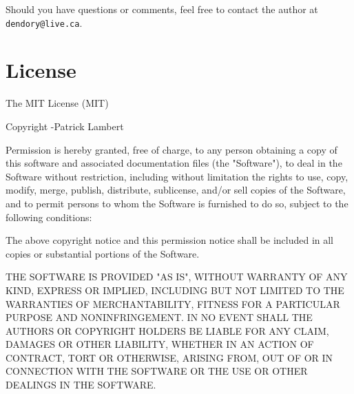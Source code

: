 \documentclass[11pt]{article}
\begin{document}
Should you have questions or comments, feel free to contact the author at \texttt{dendory@live.ca}.

\clearpage
\section{License}
The MIT License (MIT)

Copyright \textcopyright {}-\the\year \thinspace Patrick Lambert

Permission is hereby granted, free of charge, to any person obtaining a copy
of this software and associated documentation files (the "Software"), to deal
in the Software without restriction, including without limitation the rights
to use, copy, modify, merge, publish, distribute, sublicense, and/or sell
copies of the Software, and to permit persons to whom the Software is
furnished to do so, subject to the following conditions:

The above copyright notice and this permission notice shall be included in
all copies or substantial portions of the Software.

THE SOFTWARE IS PROVIDED "AS IS", WITHOUT WARRANTY OF ANY KIND, EXPRESS OR
IMPLIED, INCLUDING BUT NOT LIMITED TO THE WARRANTIES OF MERCHANTABILITY,
FITNESS FOR A PARTICULAR PURPOSE AND NONINFRINGEMENT. IN NO EVENT SHALL THE
AUTHORS OR COPYRIGHT HOLDERS BE LIABLE FOR ANY CLAIM, DAMAGES OR OTHER
LIABILITY, WHETHER IN AN ACTION OF CONTRACT, TORT OR OTHERWISE, ARISING FROM,
OUT OF OR IN CONNECTION WITH THE SOFTWARE OR THE USE OR OTHER DEALINGS IN
THE SOFTWARE.
\end{document}
